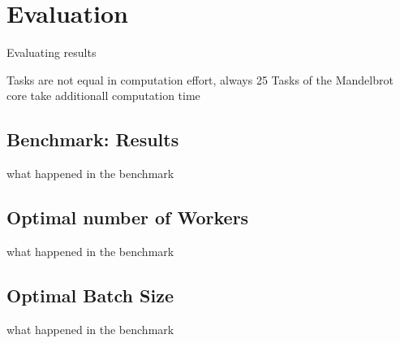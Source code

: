\chapter{Evaluation}
\label{ch:evaluation}
Evaluating results

Tasks are not equal in computation effort, always 25 Tasks of the Mandelbrot core take additionall computation time

\section{Benchmark: Results}
\label{sec:evaluation:benchmark}
what happened in the benchmark

\section{Optimal number of Workers}
\label{sec:evaluation:workers}
what happened in the benchmark

\section{Optimal Batch Size}
\label{sec:evaluation:batch}
what happened in the benchmark